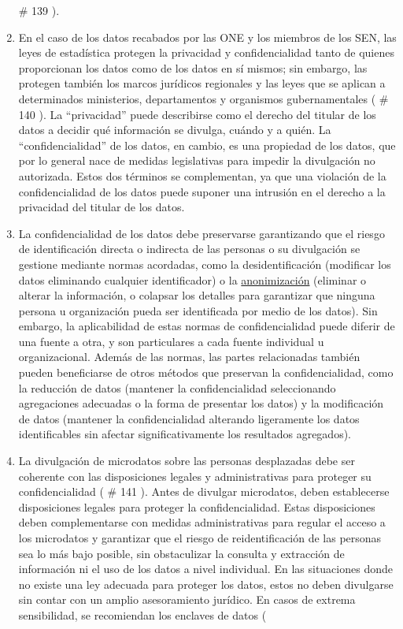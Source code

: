 \documentclass[
]{book}
\begin{document}
\begin{enumerate}
  \# 139
  ).
\item
  En el caso de los datos recabados por las ONE y los miembros de los SEN, las leyes de estadística protegen la privacidad y confidencialidad tanto de quienes proporcionan los datos como de los datos en sí mismos; sin embargo, las protegen también los marcos jurídicos regionales y las leyes que se aplican a determinados ministerios, departamentos y organismos gubernamentales (
  \# 140
  ). La ``privacidad'' puede describirse como el derecho del titular de los datos a decidir qué información se divulga, cuándo y a quién. La ``confidencialidad'' de los datos, en cambio, es una propiedad de los datos, que por lo general nace de medidas legislativas para impedir la divulgación no autorizada. Estos dos términos se complementan, ya que una violación de la confidencialidad de los datos puede suponer una intrusión en el derecho a la privacidad del titular de los datos.
\item
  La confidencialidad de los datos debe preservarse garantizando que el riesgo de identificación directa o indirecta de las personas o su divulgación se gestione mediante normas acordadas, como la desidentificación (modificar los datos eliminando cualquier identificador) o la \href{https://en.wikipedia.org/wiki/Data_anonymization}{anonimización} (eliminar o alterar la información, o colapsar los detalles para garantizar que ninguna persona u organización pueda ser identificada por medio de los datos). Sin embargo, la aplicabilidad de estas normas de confidencialidad puede diferir de una fuente a otra, y son particulares a cada fuente individual u organizacional. Además de las normas, las partes relacionadas también pueden beneficiarse de otros métodos que preservan la confidencialidad, como la reducción de datos (mantener la confidencialidad seleccionando agregaciones adecuadas o la forma de presentar los datos) y la modificación de datos (mantener la confidencialidad alterando ligeramente los datos identificables sin afectar significativamente los resultados agregados).
\item
  La divulgación de microdatos sobre las personas desplazadas debe ser coherente con las disposiciones legales y administrativas para proteger su confidencialidad (
  \# 141
  ). Antes de divulgar microdatos, deben establecerse disposiciones legales para proteger la confidencialidad. Estas disposiciones deben complementarse con medidas administrativas para regular el acceso a los microdatos y garantizar que el riesgo de reidentificación de las personas sea lo más bajo posible, sin obstaculizar la consulta y extracción de información ni el uso de los datos a nivel individual. En las situaciones donde no existe una ley adecuada para proteger los datos, estos no deben divulgarse sin contar con un amplio asesoramiento jurídico. En casos de extrema sensibilidad, se recomiendan los enclaves de datos (

\end{enumerate}
\end{document}
